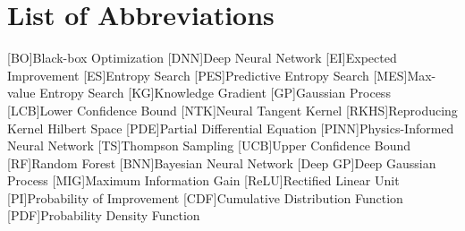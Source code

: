  \noindent


\chapter*{List of Abbreviations}
\begin{multicols}{2}
\begin{acronym}
        [BO]{Black-box Optimization}
        [DNN]{Deep Neural Network}
        [EI]{Expected Improvement}
        [ES]{Entropy Search}
        [PES]{Predictive Entropy Search}
        [MES]{Max-value Entropy Search}
        [KG]{Knowledge Gradient}
        [GP]{Gaussian Process}
        [LCB]{Lower Confidence Bound}
        [NTK]{Neural Tangent Kernel}
        [RKHS]{Reproducing Kernel Hilbert Space}
        [PDE]{Partial Differential Equation}
        [PINN]{Physics-Informed Neural Network}
        [TS]{Thompson Sampling}
        [UCB]{Upper Confidence Bound}
        [RF]{Random Forest}
        [BNN]{Bayesian Neural Network}
        [Deep GP]{Deep Gaussian Process}
        [MIG]{Maximum Information Gain}
        [ReLU]{Rectified Linear Unit}
        [PI]{Probability of Improvement}
        [CDF]{Cumulative Distribution Function}
        [PDF]{Probability Density Function}
\end{acronym}
\end{multicols}
